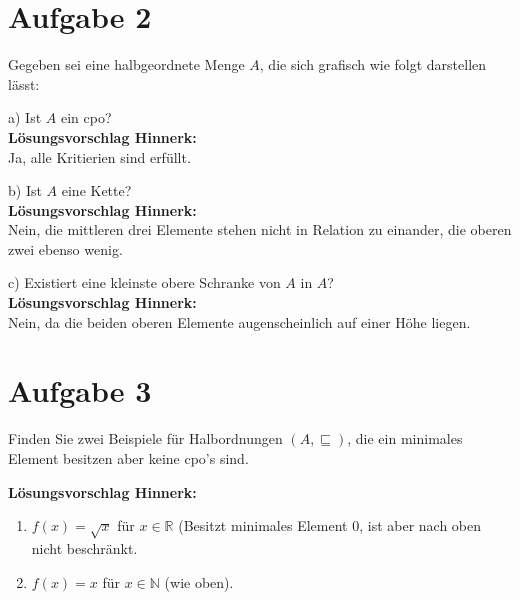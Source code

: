 \documentclass[ngerman,a4paper]{report}
\begin{document}
\section*{Aufgabe 2}
Gegeben sei eine halbgeordnete Menge $A$, die sich grafisch wie folgt darstellen lässt:\\
\begin{figure}[h]
\centering
{}

\end{figure}
\begin{compactitem}
\item[a)] Ist $A$ ein cpo?\\
\textbf{Lösungsvorschlag Hinnerk:}\\
	Ja, alle Kritierien sind erfüllt.
\item[b)] Ist $A$ eine Kette?\\
\textbf{Lösungsvorschlag Hinnerk:}\\
	Nein, die mittleren drei Elemente stehen nicht in Relation zu einander, die oberen zwei ebenso wenig.
\item[c)] Existiert eine kleinste obere Schranke von $A$ in $A$?\\
\textbf{Lösungsvorschlag Hinnerk:}\\
	Nein, da die beiden oberen Elemente augenscheinlich auf einer Höhe liegen.
\end{compactitem}
\section*{Aufgabe 3}
Finden Sie zwei Beispiele für Halbordnungen $(A,\sqsubseteq)$, die ein minimales Element besitzen aber keine cpo's sind.

\textbf{Lösungsvorschlag Hinnerk:}\\
\begin{enumerate}
	\item $f(x) = \sqrt{x}$ für $x \in \mathbb{R}$ (Besitzt minimales Element $0$, ist aber nach oben nicht beschränkt.
	\item $f(x) = x$ für $x \in \mathbb{N}$ (wie oben).
\end{enumerate}
\end{document}
